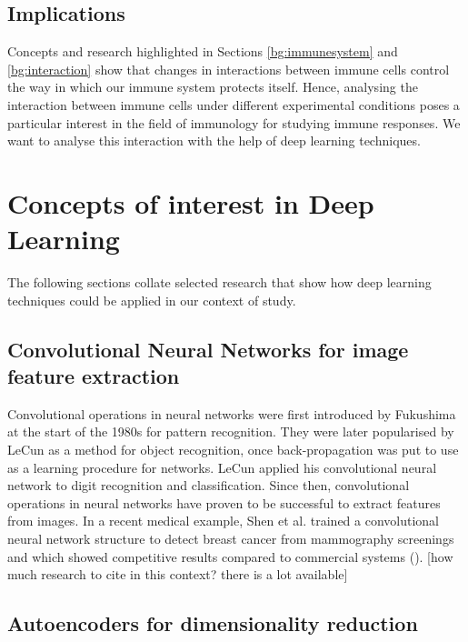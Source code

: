 \documentclass{l4proj}
\begin{document}
\subsection{Implications}

Concepts and research highlighted in Sections \ref{bg:immunesystem} and \ref{bg:interaction} show that changes in interactions between immune cells control the way in which our immune system protects itself. Hence, analysing the interaction between immune cells under different experimental conditions poses a particular interest in the field of immunology for studying immune responses. We want to analyse this interaction with the help of deep learning techniques.

\section{Concepts of interest in Deep Learning}

The following sections collate selected research that show how deep learning techniques could be applied in our context of study.

\subsection{Convolutional Neural Networks for image feature extraction}

Convolutional operations in neural networks were first introduced by Fukushima at the start of the 1980s for pattern recognition. They were later popularised by LeCun as a method for object recognition, once back-propagation was put to use as a learning procedure for networks. LeCun applied his convolutional neural network to digit recognition and classification. Since then, convolutional operations in neural networks have proven to be successful to extract features from images. In a recent medical example, Shen et al. trained a convolutional neural network structure to detect breast cancer from mammography screenings and which showed competitive results compared to commercial systems (\cite{https://www.nature.com/articles/s41598-019-48995-4}).
[how much research to cite in this context? there is a lot available]

\subsection{Autoencoders for dimensionality reduction}
\end{document}
